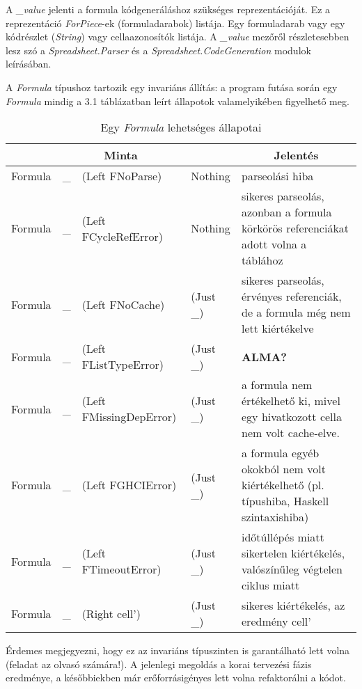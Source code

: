 A \textit{\_value} jelenti a formula kódgeneráláshoz szükséges reprezentációját.  Ez a reprezentáció \textit{ForPiece}-ek (formuladarabok) listája. Egy formuladarab vagy egy kódrészlet (\textit{String}) vagy cellaazonosítók listája. A \textit{\_value} mezőről részletesebben lesz szó a \textit{Spreadsheet.Parser} és a \textit{Spreadsheet.CodeGeneration} modulok leírásában. 

A \textit{Formula} típushoz tartozik egy invariáns állítás: a program futása során egy \textit{Formula} mindig a 3.1 táblázatban leírt állapotok valamelyikében figyelhető meg.

\begin{table}
	\centering
	\begin{tabularx}{\textwidth}{ |l l l l| X |}
		\hline
		\multicolumn{4}{|c|}{Minta} & \multicolumn{1}{|c|}{Jelentés} \\
		\hline\hline
		Formula & \_ & (Left FNoParse) & Nothing & parseolási hiba \\
		\hline
		Formula & \_ & (Left FCycleRefError) & Nothing & sikeres parseolás, azonban a formula körkörös referenciákat adott volna a táblához \\
		\hline
		Formula & \_ & (Left FNoCache) & (Just \_) & sikeres parseolás, érvényes referenciák, de a formula még nem lett kiértékelve \\
		\hline
		Formula & \_ & (Left FListTypeError) & (Just \_) & \textbf{ALMA?} \\
		\hline
		Formula & \_ & (Left FMissingDepError) & (Just \_) & a formula nem értékelhető ki, mivel egy hivatkozott cella nem volt cache-elve. \\
		\hline
		Formula & \_ & (Left FGHCIError) & (Just \_) & a formula egyéb okokból nem volt kiértékelhető (pl. típushiba, Haskell szintaxishiba) \\
		\hline
		Formula & \_ & (Left FTimeoutError) & (Just \_) & időtúllépés miatt sikertelen kiértékelés, valószínűleg végtelen ciklus miatt \\
		\hline
		Formula & \_ & (Right cell') & (Just \_) & sikeres kiértékelés, az eredmény cell' \\
		\hline 
	\end{tabularx}
	\caption[Egy \textit{Formula} lehetséges állapotai]{Egy \textit{Formula} lehetséges állapotai}
	\label{tab:formula}
\end{table}

Érdemes megjegyezni, hogy ez az invariáns típuszinten is garantálható lett volna (feladat az olvasó számára!). A jelenlegi megoldás a korai tervezési fázis eredménye, a későbbiekben már erőforrásigényes lett volna refaktorálni a kódot.   

